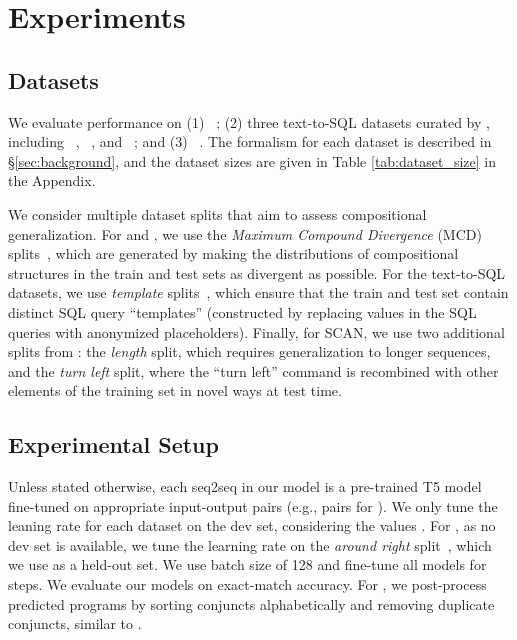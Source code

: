 \section{Experiments}
\label{sec:experiments}

\subsection{Datasets}
\label{ssec:datasets}

We evaluate performance on (1) \cfq{}~\cite{keysers2019measuring}; (2) three text-to-SQL datasets curated by \citet{finegan-dollak-etal-2018-improving}, including \geo{}~\cite{zelle-mooney-1996-learning}, \atis{}~\cite{dahl-etal-1994-expanding}, and \scholar{}~\cite{iyer-etal-2017-learning};
and (3) \scan{}~\cite{lake2018generalization}.
The formalism for each dataset is described in \S\ref{sec:background}, and the dataset sizes are given in Table \ref{tab:dataset_size} in the Appendix.

We consider multiple dataset splits that aim to assess compositional generalization.
For \cfq{} and \scan{}, we use the \emph{Maximum Compound Divergence} (MCD) splits~\cite{keysers2019measuring}, which are generated by making the distributions of compositional structures in the train and test sets as divergent as possible.
For the text-to-SQL datasets, we use \emph{template} splits~\cite{finegan-dollak-etal-2018-improving}, which ensure that the train and test set contain distinct SQL query ``templates'' (constructed by replacing values in the SQL queries with anonymized placeholders).
Finally, for SCAN, we use two additional splits from \citet{lake2018generalization}: the \emph{length} split, which requires generalization to longer sequences, and the \emph{turn left} split, where the ``turn left'' command is recombined with other elements of the training set in novel ways at test time.


\subsection{Experimental Setup}
Unless stated otherwise, each seq2seq in our model is a pre-trained T5 model~\cite{raffel2020exploring} fine-tuned on appropriate input-output pairs (e.g.,  pairs for ).
We only tune the leaning rate for each dataset on the dev set, considering the values . For \scan{}, as no dev set is available, we tune the learning rate on the \textit{around right} split~\cite{loula-etal-2018-rearranging}, which we use as a held-out set. We use batch size of 128 and fine-tune all models for  steps. We evaluate our models on exact-match accuracy. 
For \cfq{}, we post-process predicted programs by sorting conjuncts alphabetically and removing duplicate conjuncts, similar to \citet{guo2020hierarchical}.

